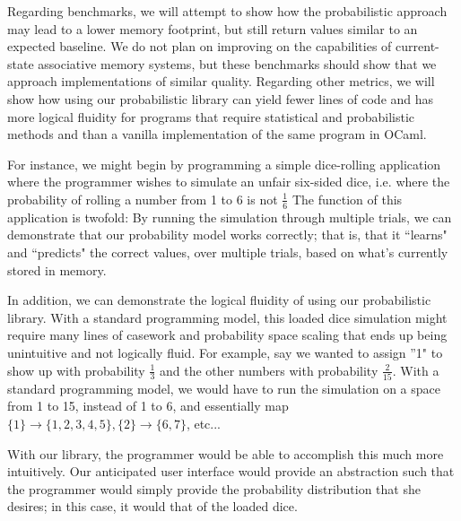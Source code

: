 \documentclass{sig-alternate}
\begin{document}
Regarding benchmarks, we will attempt to show how the probabilistic approach may lead to 
a lower memory footprint, but still return values similar to an expected baseline.
We do not plan on improving on the capabilities of current-state associative memory
systems, but these benchmarks should show that we approach implementations of similar
quality. 
Regarding other metrics, we will show how using our probabilistic library can yield 
fewer lines of code and has more logical fluidity for programs that require statistical 
and probabilistic methods and than a vanilla implementation of the same program in OCaml. 

For instance, we might begin by programming a simple dice-rolling application where the programmer wishes
to simulate an unfair six-sided dice, i.e. where the probability of rolling a number from 1 to 6 is not $\frac{1}{6}$
The function of this application is twofold: By running the simulation through multiple trials, we can demonstrate 
that our probability model works correctly; that is, that it ``learns" and ``predicts" the correct values, over multiple trials,
based on what's currently stored in memory.

In addition, we can demonstrate the logical fluidity of using our probabilistic library.
With a standard programming model, this loaded dice simulation might require many lines of casework and probability space scaling
that ends up being unintuitive and not logically fluid. For example, say we wanted to assign ''1" to show up with probability $\frac{1}{3}$
and the other numbers with probability $\frac{2}{15}$. With a standard programming model, we would have to run the simulation on a space from
1 to 15, instead of 1 to 6, and essentially map $\{1\} \rightarrow \{1, 2, 3, 4, 5\}, \{2\} \rightarrow \{6, 7\}$, etc...

With our library, the programmer would be able to accomplish this much more intuitively. Our
anticipated user interface would provide an abstraction such that the programmer would simply
provide the probability distribution that she desires; in this case, it would that of the loaded dice.
\end{document}
